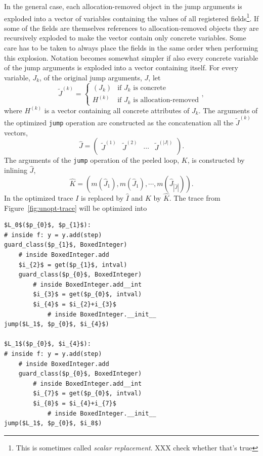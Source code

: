 \documentclass[preprint]{sigplanconf}
\begin{document}
In the general case, each allocation-removed object in the jump arguments is exploded into a
vector of variables containing the values of all registered
fields\footnote{This is sometimes called \emph{scalar replacement}. XXX check
whether that's true}. If some of the fields are themselves references to
allocation-removed objects they are recursively exploded
to make the vector contain only concrete variables. Some care has
to be taken to always place the fields in the same order when
performing this explosion. Notation becomes somewhat simpler if also every
concrete variable of the jump arguments is exploded into a vector containing
itself. For
every variable, $J_k$, of the original jump arguments, $J$, let
\begin{equation}
  \tilde J^{\left(k\right)} = \left\{
      \begin{array}{ll}
        \left(J_k\right)  & \text{if $J_k$ is concrete} \\
        H^{\left(k\right)} & \text{if $J_k$ is allocation-removed}
      \end{array}
  \right.
  ,
\end{equation}
where $H^{\left(k\right)}$ is a vector containing all concrete
attributes of $J_k$. The arguments of the optimized \lstinline{jump}
operation are constructed as the concatenation all the $\tilde J^{\left(k\right)}$ vectors,
\begin{equation}
  \hat J = \left( 
    \begin{array}{cccc}
      \tilde J^{\left(1\right)} & \tilde J^{\left(2\right)} & \cdots &
      \tilde J^{\left(|J|\right)} \\
    \end{array}
  \right)      
  .
\end{equation}
The arguments of the \lstinline{jump} operation of the peeled loop,
$K$, is constructed by inlining $\hat J$,
\begin{equation}
  \hat K = \left(m\left(\hat J_1\right), m\left(\hat J_1\right), 
                 \cdots, m\left(\hat J_{|\hat J|}\right)\right)
  .
\end{equation}
In the optimized trace $I$ is replaced by $\hat I$ and $K$ by $\hat
K$. The trace from Figure~\ref{fig:unopt-trace} will be optimized into

\begin{lstlisting}[mathescape,numbers = right,basicstyle=\setstretch{1.05}\ttfamily\scriptsize]
$L_0$($p_{0}$, $p_{1}$):
# inside f: y = y.add(step)
guard_class($p_{1}$, BoxedInteger)
    # inside BoxedInteger.add
    $i_{2}$ = get($p_{1}$, intval)
    guard_class($p_{0}$, BoxedInteger)
        # inside BoxedInteger.add__int
        $i_{3}$ = get($p_{0}$, intval)
        $i_{4}$ = $i_{2}+i_{3}$
            # inside BoxedInteger.__init__
jump($L_1$, $p_{0}$, $i_{4}$)

$L_1$($p_{0}$, $i_{4}$):
# inside f: y = y.add(step)
    # inside BoxedInteger.add
    guard_class($p_{0}$, BoxedInteger)
        # inside BoxedInteger.add__int
        $i_{7}$ = get($p_{0}$, intval)
        $i_{8}$ = $i_{4}+i_{7}$
            # inside BoxedInteger.__init__
jump($L_1$, $p_{0}$, $i_8$)
\end{lstlisting}
\end{document}
